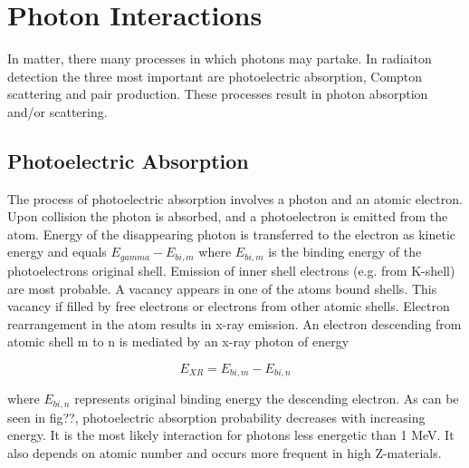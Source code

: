 \section{Photon Interactions}
In matter, there many processes in which photons may partake. In radiaiton detection the three most important are photoelectric absorption, Compton scattering and pair production. These processes result in photon absorption and/or scattering.

\subsection{Photoelectric Absorption}
The process of photoelectric absorption involves a photon and an atomic electron. Upon collision the photon is absorbed, and a photoelectron is emitted from the atom. Energy of the disappearing photon is transferred to the electron as kinetic energy and equals $E_{gamma}-E_{bi,m}$
where $E_{bi,m}$ is the binding energy of the photoelectrons original shell. Emission of inner shell electrons (e.g. from K-shell) are most probable.
A vacancy appears in one of the atoms bound shells. This vacancy if filled by free electrons or electrons from other atomic shells. Electron rearrangement in the atom results in x-ray emission. An electron descending from atomic shell m to n is mediated by an x-ray photon of energy

    \begin{equation}
    E_{XR}=E_{bi,m}-E_{bi,n}
    \end{equation}

where $E_{bi,n}$ represents original binding energy the descending electron.
As can be seen in fig??, photoelectric absorption probability decreases with increasing energy. It is the most likely interaction for photons less energetic than 1 MeV. It also depends on atomic number and occurs more frequent in high Z-materials.


